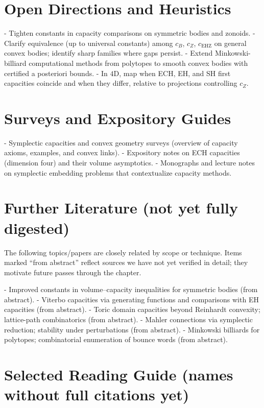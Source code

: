 \section{Open Directions and Heuristics}

- Tighten constants in capacity comparisons on symmetric bodies and zonoids.
- Clarify equivalence (up to universal constants) among $c_B$, $c_Z$, $c_{\mathrm{EHZ}}$ on general convex
  bodies; identify sharp families where gaps persist.
- Extend Minkowski-billiard computational methods from polytopes to smooth convex bodies with
  certified a posteriori bounds.
- In $4$D, map when ECH, EH, and SH first capacities coincide and when they differ, relative to
  projections controlling $c_Z$.

\section{Surveys and Expository Guides}

- Symplectic capacities and convex geometry surveys (overview of capacity axioms, examples, and convex links).
- Expository notes on ECH capacities (dimension four) and their volume asymptotics.
- Monographs and lecture notes on symplectic embedding problems that contextualize capacity methods.

\section{Further Literature (not yet fully digested)}

The following topics/papers are closely related by scope or technique. Items marked “from abstract”
reflect sources we have not yet verified in detail; they motivate future passes through the chapter.

- Improved constants in volume--capacity inequalities for symmetric bodies (from abstract).
- Viterbo capacities via generating functions and comparisons with EH capacities (from abstract).
- Toric domain capacities beyond Reinhardt convexity; lattice-path combinatorics (from abstract).
- Mahler connections via symplectic reduction; stability under perturbations (from abstract).
- Minkowski billiards for polytopes; combinatorial enumeration of bounce words (from abstract).

\section{Selected Reading Guide (names without full citations yet)}

